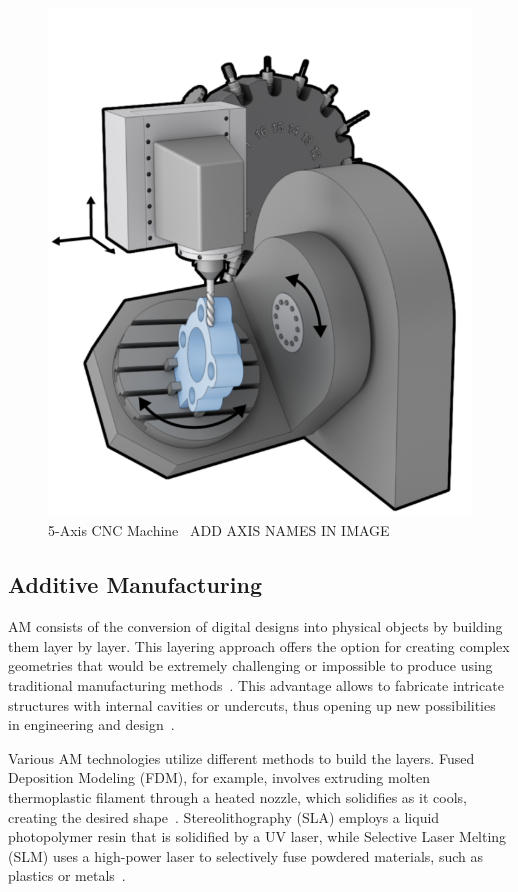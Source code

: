 \begin{figure}[H]
	\centerline{\includegraphics[scale=.45]{figures/5ax.png}}
	\caption{5-Axis CNC Machine~\cite{5ax} ADD AXIS NAMES IN IMAGE}
	\label{5ax}
\end{figure}


\newpage
\subsection{Additive Manufacturing}
AM consists of the conversion of digital designs into physical objects by building them layer by layer. This layering approach offers the option for creating complex geometries that would be extremely challenging or impossible to produce using traditional manufacturing methods~\cite{Prakash.2018}. This advantage allows to fabricate intricate structures with internal cavities or undercuts, thus opening up new possibilities in engineering and design~\cite{Abdulhameed.2019}.%

Various AM technologies utilize different methods to build the layers. Fused Deposition Modeling (FDM), for example, involves extruding molten thermoplastic filament through a heated nozzle, which solidifies as it cools, creating the desired shape~\cite{Wickramasinghe.2020}. Stereolithography (SLA) employs a liquid photopolymer resin that is solidified by a UV laser, while Selective Laser Melting (SLM) uses a high-power laser to selectively fuse powdered materials, such as plastics or metals~\cite{Wang.2016, Meier.2017}.


